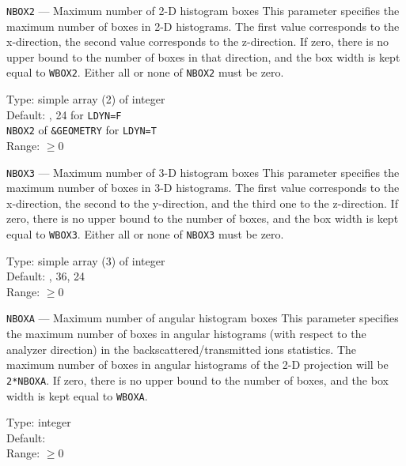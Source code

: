 \begin{keydescription}{\texttt{NBOX2} --- Maximum number of 2-D histogram boxes} 
%
  This parameter specifies the maximum number of boxes in 2-D histograms. The first value 
  corresponds to the x-direction, the second value corresponds to the
  z-direction. If zero, there is no upper bound to the number of boxes in that
  direction, and the box width is kept equal to \texttt{WBOX2}. Either all or
  none of \texttt{NBOX2} must be zero.
  \begin{keytab}
    Type:    \> simple array (2) of integer \\
    Default: , 24 for \texttt{LDYN=F} \\
             \> \texttt{NBOX2} of \texttt{\&GEOMETRY} for \texttt{LDYN=T} \\
    Range:   \> $\ge 0$
  \end{keytab}
\end{keydescription}

\begin{keydescription}{\texttt{NBOX3} --- Maximum number of 3-D histogram boxes} 
%
  This parameter specifies the maximum number of boxes in 3-D histograms. The first value 
  corresponds to the x-direction, the second to the y-direction, and the third one to the 
  z-direction. If zero, there is no upper bound to the number of boxes, and the
  box width is kept equal to \texttt{WBOX3}. Either all or none of \texttt{NBOX3} must be zero. 
  \begin{keytab}
    Type:    \> simple array (3) of integer \\
    Default: , 36, 24 \\
    Range:   \> $\ge 0$
  \end{keytab}
\end{keydescription}

\begin{keydescription}{\texttt{NBOXA} --- Maximum number of angular histogram boxes}
%
  This parameter specifies the maximum number of boxes in angular histograms
  (with respect to the analyzer direction) in the backscattered/transmitted ions
  statistics.  The maximum number of boxes in angular histograms of the 2-D
  projection will be \texttt{2*NBOXA}. If zero, there is no upper bound to the
  number of boxes, and the box width is kept equal to \texttt{WBOXA}.
  \begin{keytab}
    Type:    \> integer \\
    Default:  \\
    Range:   \> $\ge 0$
  \end{keytab}
\end{keydescription}

